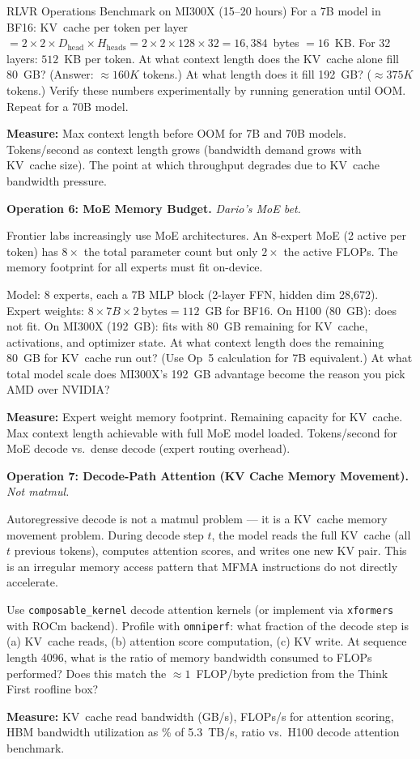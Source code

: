 \begin{exercise}{RLVR Operations Benchmark on MI300X (15--20 hours)}
For a 7B model in BF16: KV~cache per token per layer $= 2 \times 2 \times D_{\text{head}} \times H_{\text{heads}} = 2 \times 2 \times 128 \times 32 = 16,384$~bytes $= 16$~KB. For 32 layers: $512$~KB per token. At what context length does the KV~cache alone fill 80~GB? (Answer: $\approx 160K$ tokens.) At what length does it fill 192~GB? ($\approx 375K$ tokens.) Verify these numbers experimentally by running generation until OOM. Repeat for a 70B model.

\textbf{Measure:} Max context length before OOM for 7B and 70B models. Tokens/second as context length grows (bandwidth demand grows with KV~cache size). The point at which throughput degrades due to KV~cache bandwidth pressure.

\medskip
\textbf{Operation 6: MoE Memory Budget.} \textit{Dario's MoE bet.}

Frontier labs increasingly use MoE architectures. An 8-expert MoE (2 active per token) has $8\times$ the total parameter count but only $2\times$ the active FLOPs. The memory footprint for all experts must fit on-device.

Model: 8 experts, each a 7B MLP block (2-layer FFN, hidden dim 28,672). Expert weights: $8 \times 7B \times 2~\text{bytes} = 112$~GB for BF16. On H100 (80~GB): does not fit. On MI300X (192~GB): fits with 80~GB remaining for KV~cache, activations, and optimizer state. At what context length does the remaining 80~GB for KV~cache run out? (Use Op~5 calculation for 7B equivalent.) At what total model scale does MI300X's 192~GB advantage become the reason you pick AMD over NVIDIA?

\textbf{Measure:} Expert weight memory footprint. Remaining capacity for KV~cache. Max context length achievable with full MoE model loaded. Tokens/second for MoE decode vs.\ dense decode (expert routing overhead).

\medskip
\textbf{Operation 7: Decode-Path Attention (KV Cache Memory Movement).} \textit{Not matmul.}

Autoregressive decode is not a matmul problem --- it is a KV~cache memory movement problem. During decode step $t$, the model reads the full KV~cache (all $t$ previous tokens), computes attention scores, and writes one new KV pair. This is an irregular memory access pattern that MFMA instructions do not directly accelerate.

Use \texttt{composable\_kernel} decode attention kernels (or implement via \texttt{xformers} with ROCm backend). Profile with \texttt{omniperf}: what fraction of the decode step is (a) KV~cache reads, (b) attention score computation, (c) KV write. At sequence length 4096, what is the ratio of memory bandwidth consumed to FLOPs performed? Does this match the $\approx 1$~FLOP/byte prediction from the Think First roofline box?

\textbf{Measure:} KV~cache read bandwidth (GB/s), FLOPs/s for attention scoring, HBM bandwidth utilization as \% of 5.3~TB/s, ratio vs.\ H100 decode attention benchmark.
\end{exercise}

